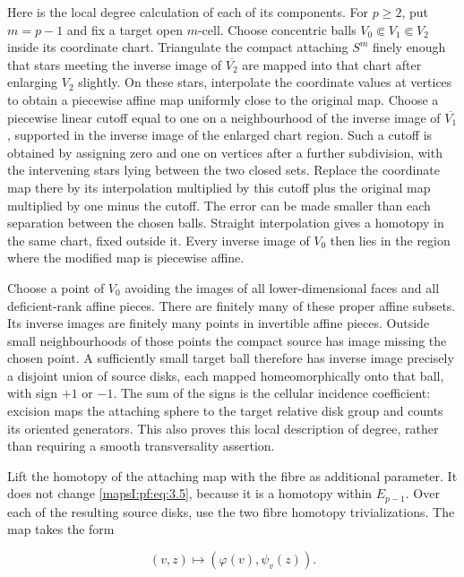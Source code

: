 Here is the local degree calculation of each of its components. For \(p\geq2\), put \(m=p-1\) and fix a target open \(m\)-cell. Choose concentric balls \(V_0\Subset V_1\Subset V_2\) inside its coordinate chart. Triangulate the compact attaching \(S^m\) finely enough that stars meeting the inverse image of \(\overline{V_2}\) are mapped into that chart after enlarging \(V_2\) slightly. On these stars, interpolate the coordinate values at vertices to obtain a piecewise affine map uniformly close to the original map. Choose a piecewise linear cutoff equal to one on a neighbourhood of the inverse image of \(\overline{V_1}\), supported in the inverse image of the enlarged chart region. Such a cutoff is obtained by assigning zero and one on vertices after a further subdivision, with the intervening stars lying between the two closed sets. Replace the coordinate map there by its interpolation multiplied by this cutoff plus the original map multiplied by one minus the cutoff. The error can be made smaller than each separation between the chosen balls. Straight interpolation gives a homotopy in the same chart, fixed outside it. Every inverse image of \(V_0\) then lies in the region where the modified map is piecewise affine.

Choose a point of \(V_0\) avoiding the images of all lower-dimensional faces and all deficient-rank affine pieces. There are finitely many of these proper affine subsets. Its inverse images are finitely many points in invertible affine pieces. Outside small neighbourhoods of those points the compact source has image missing the chosen point. A sufficiently small target ball therefore has inverse image precisely a disjoint union of source disks, each mapped homeomorphically onto that ball, with sign \(+1\) or \(-1\). The sum of the signs is the cellular incidence coefficient: excision maps the attaching sphere to the target relative disk group and counts its oriented generators. This also proves this local description of degree, rather than requiring a smooth transversality assertion.

Lift the homotopy of the attaching map with the fibre as additional parameter. It does not change \eqref{mapsI:pf:eq:3.5}, because it is a homotopy within \(E_{p-1}\). Over each of the resulting source disks, use the two fibre homotopy trivializations. The map takes the form

\begin{equation}
(v,z)\longmapsto(\varphi(v),\psi_v(z)).
\label{mapsI:pf:eq:3.7}
\end{equation}

